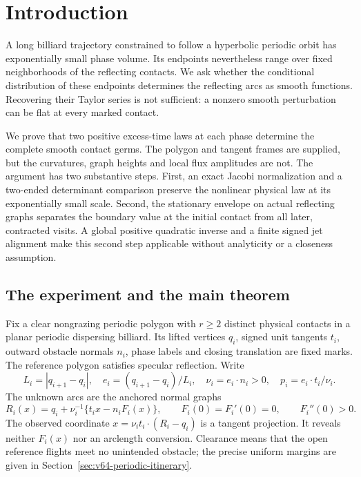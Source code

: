 \section{Introduction}
\label{sec:v75-introduction}
\label{sec:v70-introduction}

A long billiard trajectory constrained to follow a hyperbolic periodic
orbit has exponentially small phase volume.  Its endpoints nevertheless
range over fixed neighborhoods of the reflecting contacts.  We ask
whether the conditional distribution of these endpoints determines the
reflecting arcs as smooth functions.  Recovering their Taylor series is
not sufficient: a nonzero smooth perturbation can be flat at every
marked contact.

We prove that two positive excess-time laws at each phase determine the
complete smooth contact germs.  The polygon and tangent frames are
supplied, but the curvatures, graph heights and local flux amplitudes are
not.  The argument has two substantive steps.  First, an exact Jacobi
normalization and a two-ended determinant comparison preserve the
nonlinear physical law at its exponentially small scale.  Second, the
stationary envelope on actual reflecting graphs separates the boundary
value at the initial contact from all later, contracted visits.  A global
positive quadratic inverse and a finite signed jet alignment make this
second step applicable without analyticity or a closeness assumption.

\subsection{The experiment and the main theorem}

Fix a clear nongrazing periodic polygon with $r\ge2$ distinct physical
contacts in a planar periodic dispersing billiard.  Its lifted vertices
$q_i$, signed unit tangents $t_i$, outward obstacle normals $n_i$, phase
labels and closing translation are fixed marks.  The reference polygon
satisfies specular reflection.  Write
\[
 L_i=|q_{i+1}-q_i|,\quad e_i=(q_{i+1}-q_i)/L_i,\quad
 \nu_i=e_i\cdot n_i>0,\quad p_i=e_i\cdot t_i/\nu_i.
\]
The unknown arcs are the anchored normal graphs
\begin{equation}\label{eq:v75-graphs}
 R_i(x)=q_i+\nu_i^{-1}\{t_i x-n_iF_i(x)\},\qquad
 F_i(0)=F_i'(0)=0,\qquad F_i''(0)>0.
\end{equation}
The observed coordinate $x=\nu_i t_i\cdot(R_i-q_i)$ is a tangent
projection.  It reveals neither $F_i(x)$ nor an arclength conversion.
Clearance means that the open reference flights meet no unintended
obstacle; the precise uniform margins are given in
Section~\ref{sec:v64-periodic-itinerary}.

